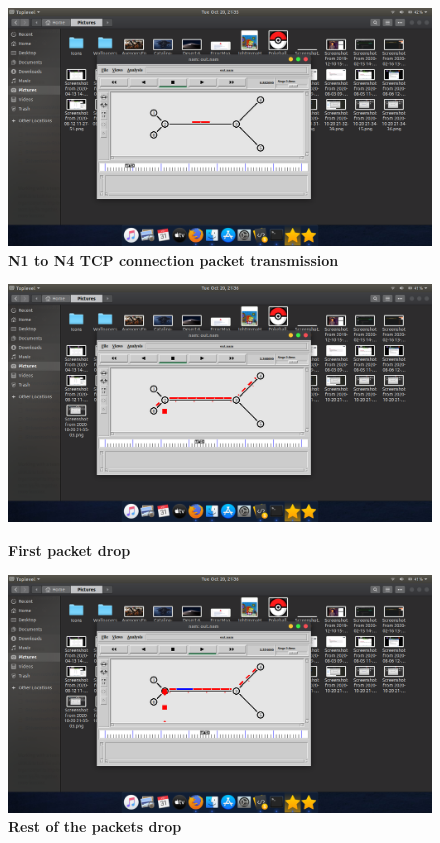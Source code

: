 \documentclass[12pt,letterpaper]{article}
\begin{document}
\begin{flushleft}
\begin{figure}[t]
    \includegraphics[trim = 100mm 50mm 135mm 70mm, clip, width = \textwidth]{Pics/TCPTrans.png}
    \caption{\textbf{N1 to N4 TCP connection packet transmission}}
\end{figure}
\begin{figure}[t]
	\centering
    \includegraphics[trim = 100mm 50mm 135mm 70mm, clip, width = \textwidth]{Pics/Firstdrop.png}
    \caption{\textbf{First packet drop}}

    \includegraphics[trim = 100mm 50mm 135mm 70mm, clip, width = \textwidth]{Pics/Packetdrop.png}
    \caption{\textbf{Rest of the packets drop}}
\end{figure}

\end{flushleft}
\end{document}
